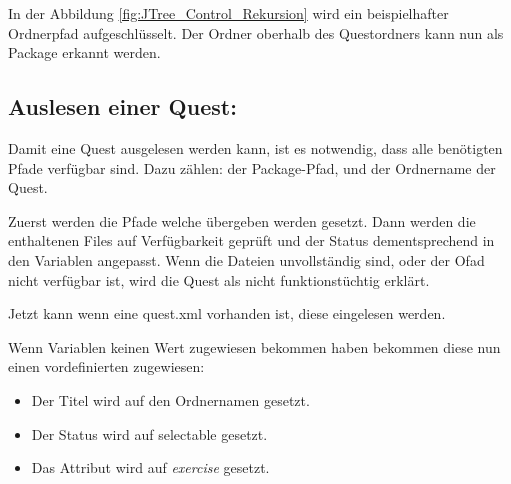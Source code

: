 In der Abbildung \ref{fig:JTree_Control_Rekursion} wird ein beispielhafter Ordnerpfad aufgeschlüsselt. Der Ordner oberhalb des Questordners kann nun als Package erkannt werden.

\subsection{Auslesen einer Quest:}
Damit eine Quest ausgelesen werden kann, ist es notwendig, dass alle benötigten Pfade verfügbar sind. Dazu zählen: der Package-Pfad, und der Ordnername der Quest.

Zuerst werden die Pfade welche übergeben werden gesetzt. Dann werden die enthaltenen Files auf Verfügbarkeit geprüft und der Status dementsprechend in den Variablen angepasst. Wenn die Dateien unvollständig sind, oder der Ofad nicht verfügbar ist, wird die Quest als nicht funktionstüchtig erklärt.

Jetzt kann wenn eine quest.xml vorhanden ist, diese eingelesen werden. 

Wenn Variablen keinen Wert zugewiesen bekommen haben bekommen diese nun einen vordefinierten zugewiesen:
\begin{itemize}
	\item Der Titel wird auf den Ordnernamen gesetzt.
	\item Der Status wird auf selectable gesetzt.
	\item Das Attribut wird auf \textit{exercise} gesetzt.
\end{itemize}